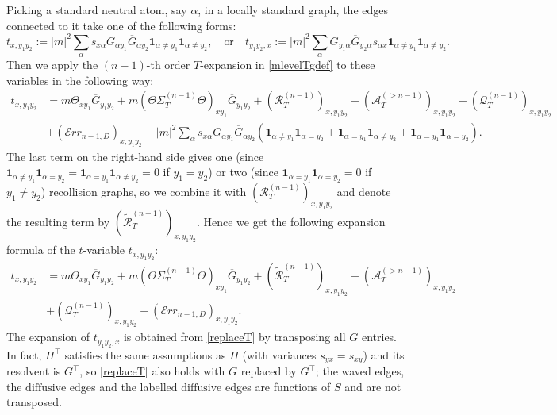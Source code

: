 \documentclass{article}
\newcommand{\1}{\mathds{1}}
\numberwithin{equation}{section}
\newcommand{\al}{\alpha}
\newcommand{\dashed}{\text{diffusive}}
\theoremstyle{plain} %
\theoremstyle{remark}
\newcommand{\Sdelta}{{\Sigma}_T}
\newcommand{\PT}{\mathcal R_T}
\newcommand{\wtPT}{\widetilde{\mathcal R}_T}
\newcommand{\QT}{\mathcal Q_T}
\newcommand{\AT}{\mathcal A_T}
\newcommand{\Err}{{\mathcal Err}}
\begin{document}
Picking a standard neutral atom, say $\al$, in a locally standard graph, the edges connected to it take one of the following forms:
\begin{equation}\label{12in4T}
	t_{x,y_1 y_2} :=|m|^2\sum_\al s_{x\al}G_{\al y_1}\overline G_{\al y_2}\mathbf 1_{\al\ne y_1}\mathbf 1_{\al\ne y_2},\quad \text{or}\quad t_{y_1y_2, x}:=|m|^2\sum_\al G_{ y_1\al }\overline G_{y_2 \al}s_{\al x}\mathbf 1_{\al\ne y_1}\mathbf 1_{\al\ne y_2} .
\end{equation}
Then we apply the $(n-1)$-th order $T$-expansion in \eqref{mlevelTgdef} to these variables in the following way: %
\begin{align*}
	t_{x,y_1 y_2} & = m  \Theta_{xy_1}\overline G_{y_1y_2} +m (\Theta \Sdelta^{(n-1)}\Theta)_{xy_1} \overline G_{y_1y_2} + (\PT^{(n-1)})_{x,y_1 y_2} +  (\AT^{(>n-1)})_{x,y_1y_2}  + (\QT^{(n-1)})_{x,y_1y_2} \nonumber\\
	& +  (\Err_{n-1,D})_{x,y_1y_2}  - |m|^2\sum_\al s_{x\al}G_{\al y_1}\overline G_{\al y_2}\left(\mathbf 1_{\al\ne y_1}\mathbf 1_{\al = y_2}+\mathbf 1_{\al=y_1}\mathbf 1_{\al \ne y_2} +\mathbf 1_{\al = y_1}\mathbf 1_{\al = y_2}\right) .
\end{align*}
The last term on the right-hand side gives one (since $\mathbf 1_{\al\ne y_1}\mathbf 1_{\al = y_2} =\mathbf 1_{\al=y_1}\mathbf 1_{\al \ne y_2}=0$ if $y_1= y_2$) or two (since $\mathbf 1_{\al = y_1}\mathbf 1_{\al = y_2} =0$ if $y_1\ne y_2$) recollision graphs, so we combine it with {$ (\PT^{(n-1)})_{x,y_1 y_2}$} and denote the resulting term by {$(\wtPT^{(n-1)})_{x,y_1 y_2}$}. Hence we get the following expansion formula of the $t$-variable $t_{x,y_1 y_2}$:
\begin{align}
	t_{x,y_1 y_2} &=   m  \Theta_{xy_1}\overline G_{y_1y_2} +m   (\Theta \Sdelta^{(n-1)}\Theta)_{xy_1} \overline G_{y_1y_2}  +  (\wtPT^{(n-1)})_{x,y_1 y_2} +  (\AT^{(>n-1)})_{x,y_1y_2}  \nonumber\\
	& + (\QT^{(n-1)})_{x,y_1y_2} +  (\Err_{n-1,D})_{x,y_1y_2} .\label{replaceT}
\end{align}
The expansion of $t_{y_1y_2, x}$ is obtained from \eqref{replaceT} by transposing all $G$ entries. In fact, $H^\top$ satisfies the same assumptions as $H$ (with variances $s_{yx}=s_{xy}$) and its resolvent is $G^\top$, so \eqref{replaceT} also holds with $G$ replaced by $G^\top$; the waved edges, the $\dashed$ edges and the labelled $\dashed$ edges are functions of $S$ and are not transposed.
\end{document}
